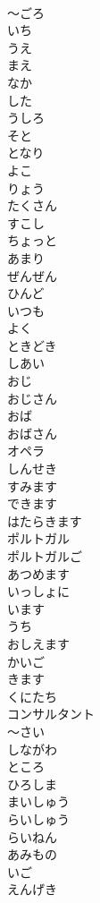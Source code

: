 \documentclass[8pt]{extreport}
\begin{document}
\begin{CJK}{UTF8}{min}
\\	～ごろ	
\\	いち	
\\	うえ	
\\	まえ	
\\	なか	
\\	した	
\\	うしろ	
\\	そと	
\\	となり	
\\	よこ	
\\	りょう	
\\	たくさん	
\\	すこし 
\\	ちょっと	
\\	あまり	
\\	ぜんぜん	
\\	ひんど	
\\	いつも	
\\	よく	
\\	ときどき	
\\	しあい	
\\	おじ	
\\	おじさん	
\\	おば	
\\	おばさん	
\\	オペラ	
\\	しんせき	
\\	すみます	
\\	できます	
\\	はたらきます	
\\	ポルトガル	
\\	ポルトガルご	
\\	あつめます	
\\	いっしょに	
\\	います	
\\	うち	
\\	おしえます	
\\	かいご	
\\	きます	
\\	くにたち	
\\	コンサルタント	
\\	～さい	
\\	しながわ	
\\	ところ	
\\	ひろしま	
\\	まいしゅう	
\\	らいしゅう	
\\	らいねん	
\\	あみもの	
\\	いご	
\\	えんげき	

\end{CJK}
\end{document}
